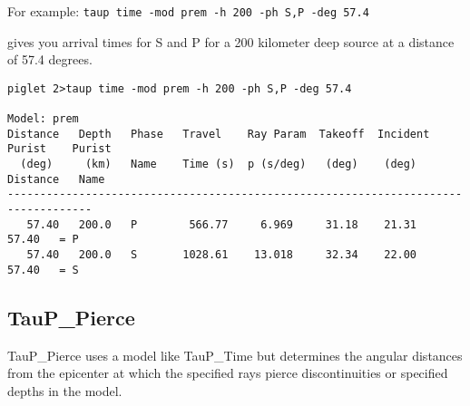 For example: \texttt{taup time -mod prem -h 200 -ph S,P -deg 57.4}

gives you arrival times for S and P for a 200 kilometer
deep source at a distance of 57.4 degrees.
\begin{verbatim}
piglet 2>taup time -mod prem -h 200 -ph S,P -deg 57.4

Model: prem
Distance   Depth   Phase   Travel    Ray Param  Takeoff  Incident  Purist    Purist
  (deg)     (km)   Name    Time (s)  p (s/deg)   (deg)    (deg)   Distance   Name
-----------------------------------------------------------------------------------
   57.40   200.0   P        566.77     6.969     31.18    21.31    57.40   = P
   57.40   200.0   S       1028.61    13.018     32.34    22.00    57.40   = S
\end{verbatim}

\subsection{TauP\_Pierce}

TauP\_Pierce uses a model like TauP\_Time but
determines the
angular distances from the epicenter at which the specified rays pierce
discontinuities or specified depths in the model.

